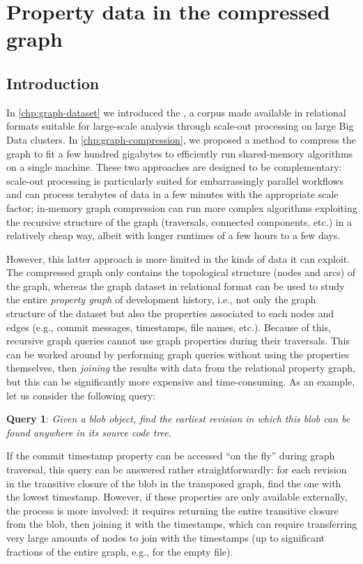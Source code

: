 \chapter{Property data in the compressed graph}%
\label{chp:graph-metadata}

\section{Introduction}

In \cref{chp:graph-dataset} we introduced the \SWHGD{}, a corpus made available
in relational formats suitable for large-scale analysis through scale-out
processing on large Big Data clusters.
In \cref{chp:graph-compression}, we proposed a method to compress the graph to
fit a few hundred gigabytes to efficiently run shared-memory algorithms on a
single machine.
These two approaches are designed to be complementary: scale-out processing is
particularly suited for embarrassingly parallel workflows and can process
terabytes of data in a few minutes with the appropriate scale factor; in-memory
graph compression can run more complex algorithms exploiting the recursive
structure of the graph (traversals, connected components, etc.) in a relatively
cheap way, albeit with longer runtimes of a few hours to a few days.

However, this latter approach is more limited in the kinds of data it can
exploit. The compressed graph only contains the topological structure (nodes
and arcs) of the graph, whereas the graph dataset in relational format can be
used to study the entire \emph{property graph} of development history, i.e.,
not only the graph structure of the dataset but also the properties associated
to each nodes and edges (e.g., commit messages, timestamps, file names, etc.).
Because of this, recursive graph queries cannot use graph properties during
their traversals. This can be worked around by performing graph queries
without using the properties themselves, then \emph{joining} the results with
data from the relational property graph, but this can be significantly more
expensive and time-consuming.
As an example, let us consider the following query:

\textbf{Query 1}: \emph{Given a blob object, find the earliest revision in
which this blob can be found anywhere in its source code tree.}

If the commit timestamp property can be accessed ``on the fly'' during graph
traversal, this query can be answered rather straightforwardly: for each
revision in the transitive closure of the blob in the transposed graph, find
the one with the lowest timestamp. However, if these properties are only
available externally, the process is more involved: it requires returning the
entire transitive closure from the blob, then joining it with the timestamps,
which can require transferring very large amounts of nodes to join with the
timestamps (up to significant fractions of the entire graph, e.g., for the
empty file).

